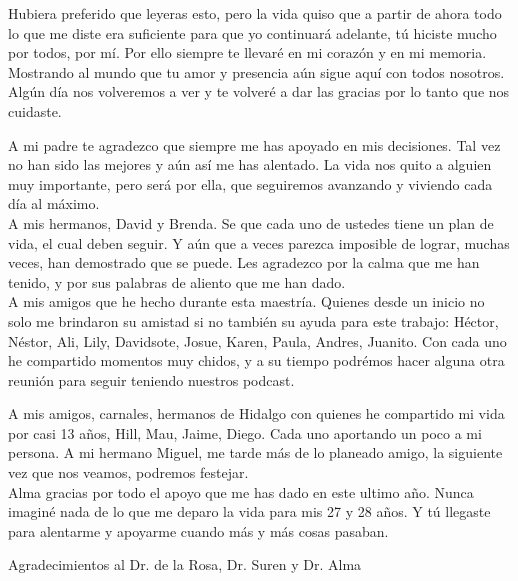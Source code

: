 
Hubiera preferido que leyeras esto, pero la vida quiso que a partir de ahora todo lo que me diste era suficiente para que yo continuará adelante, tú hiciste mucho por todos, por mí. Por ello siempre te llevaré en mi corazón y en mi memoria. Mostrando al mundo que tu amor y presencia aún sigue aquí con todos nosotros. Algún día nos volveremos a ver y te volveré a dar las gracias por lo tanto que nos cuidaste.

A mi padre te agradezco que siempre me has apoyado en mis decisiones. Tal vez no han sido las mejores y aún así me has alentado. La vida nos quito a alguien muy importante, pero será por ella, que seguiremos avanzando y viviendo cada día al máximo.
\\
A mis hermanos, David y Brenda. Se que cada uno de ustedes tiene un plan de vida, el cual deben seguir. Y aún que a veces parezca imposible de lograr, muchas veces, han demostrado que se puede. Les agradezco por la calma que me han tenido, y por sus palabras de aliento que me han dado.
\\
A mis amigos que he hecho durante esta maestría. Quienes desde un inicio no solo me brindaron su amistad si no también su ayuda para este trabajo: Héctor, Néstor, Ali, Lily, Davidsote, Josue, Karen, Paula, Andres, Juanito. Con cada uno he compartido momentos muy chidos, y a su tiempo podrémos hacer alguna otra reunión para seguir teniendo nuestros podcast.

A mis amigos, carnales, hermanos de Hidalgo con quienes he compartido mi vida por casi 13 años, Hill, Mau, Jaime, Diego. Cada uno aportando un poco a mi persona. A mi hermano Miguel, me tarde más de lo planeado amigo, la siguiente vez que nos veamos, podremos festejar.
\\
Alma gracias por todo el apoyo que me has dado en este ultimo año. Nunca imaginé nada de lo que me deparo la vida para mis 27 y 28 años. Y tú llegaste para alentarme y apoyarme cuando más y más cosas pasaban. 

Agradecimientos al Dr. de la Rosa, Dr. Suren y Dr. Alma